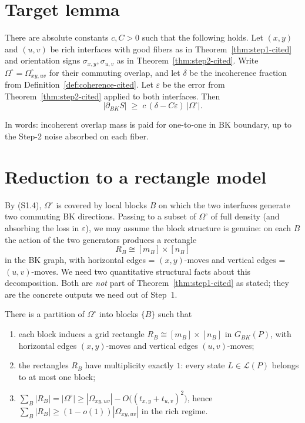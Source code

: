 \section{Target lemma}
\label{sec:target}

\begin{theorem}
\label{thm:step4}
There are absolute constants $c,C>0$ such that the following holds.
Let $(x,y)$ and $(u,v)$ be rich interfaces with good fibers as in
Theorem~\ref{thm:step1-cited} and orientation signs $\sigma_{x,y},\sigma_{u,v}$
as in Theorem~\ref{thm:step2-cited}. Write
$\Omega^\circ=\Omega^\circ_{xy,uv}$ for their commuting overlap, and let
$\delta$ be the incoherence fraction from Definition~\ref{def:coherence-cited}.
Let $\varepsilon$ be the error from Theorem~\ref{thm:step2-cited} applied to
both interfaces. Then
\[
\big|\partial_{BK}S\big|
\;\ge\;
c\,(\delta - C\varepsilon)\,|\Omega^\circ|.
\]
\end{theorem}

In words: incoherent overlap mass is paid for one-to-one in BK boundary,
up to the Step-2 noise absorbed on each fiber.

\section{Reduction to a rectangle model}
\label{sec:rectangle-model}

By (S1.4), $\Omega^\circ$ is covered by local blocks $B$ on which the two
interfaces generate two commuting BK directions. Passing to a subset of
$\Omega^\circ$ of full density (and absorbing the loss in $\varepsilon$),
we may assume the block structure is genuine: on each $B$ the action of
the two generators produces a rectangle
\[
R_B\cong[m_B]\times[n_B]
\]
in the BK graph, with horizontal edges = $(x,y)$-moves and vertical edges
= $(u,v)$-moves. We need two quantitative structural facts about this
decomposition. Both are {\em not} part of Theorem~\ref{thm:step1-cited} as
stated; they are the concrete outputs we need out of Step~1.

\begin{proposition}
\label{prop:G1}
There is a partition of $\Omega^\circ$ into blocks $\{B\}$ such that
\begin{enumerate}[label=\textup{(G1.\arabic*)}]
\item each block induces a grid rectangle $R_B\cong[m_B]\times[n_B]$
in $G_{BK}(P)$, with horizontal edges $(x,y)$-moves and vertical
edges $(u,v)$-moves;
\item the rectangles $R_B$ have multiplicity exactly $1$: every
state $L\in\mathcal L(P)$ belongs to at most one block;
\item $\sum_B |R_B|=|\Omega^\circ|
\ge |\Omega_{xy,uv}|-O\!\bigl((t_{x,y}+t_{u,v})^{2}\bigr)$,
hence $\sum_B|R_B|\ge(1-o(1))|\Omega_{xy,uv}|$ in the rich regime.
\end{enumerate}
\end{proposition}

